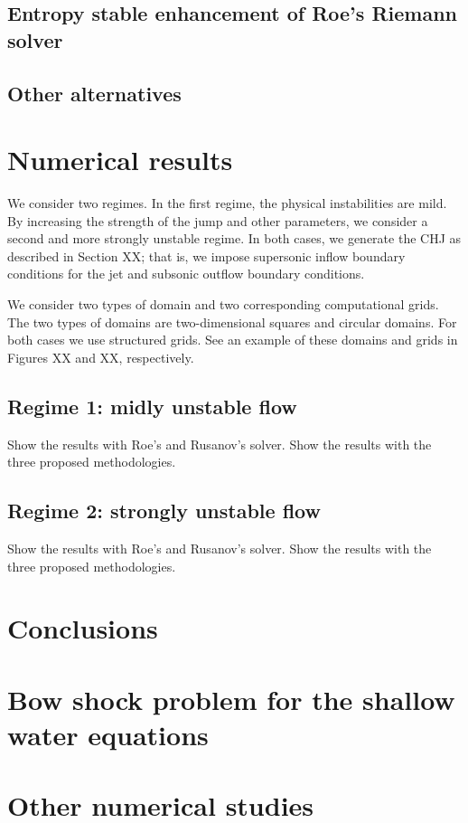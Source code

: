 \documentclass[preprint, 11pt]{article}
\begin{document}
\subsection{Entropy stable enhancement of Roe's Riemann solver}

\subsection{Other alternatives}

\section{Numerical results}

We consider two regimes. In the first regime, the physical instabilities are mild. 
By increasing the strength of the jump and other parameters, we consider a second 
and more strongly unstable regime. In both cases, we generate the CHJ as described in 
Section XX; that is, we impose supersonic inflow boundary conditions for the jet and 
subsonic outflow boundary conditions. 

We consider two types of domain and two corresponding computational grids. 
The two types of domains are two-dimensional squares and circular domains. 
For both cases we use structured grids. See an example of these domains and grids in Figures XX and XX, 
respectively.

\subsection{Regime 1: midly unstable flow}

Show the results with Roe's and Rusanov's solver. 
Show the results with the three proposed methodologies. 

\subsection{Regime 2: strongly unstable flow}

Show the results with Roe's and Rusanov's solver. 
Show the results with the three proposed methodologies. 

\section{Conclusions}

\appendix
\section{Bow shock problem for the shallow water equations}

\section{Other numerical studies}



\end{document}
